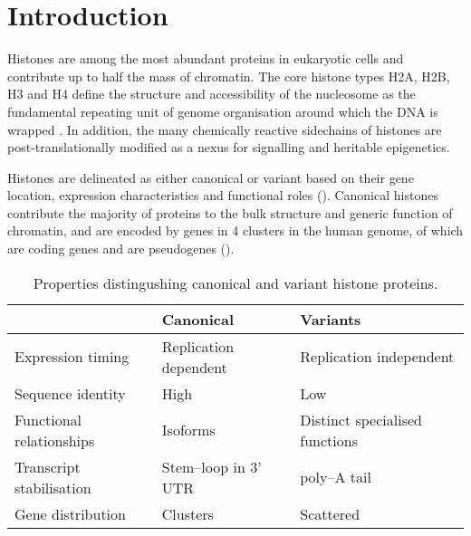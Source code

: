 \section{Introduction}

  Histones are among the most abundant proteins in eukaryotic cells
  and contribute up to half the mass of chromatin.
  The core histone types H2A, H2B, H3 and H4
  define the structure and accessibility of the nucleosome
  as the fundamental repeating unit of genome organisation
  around which the DNA is wrapped \citep{Luger1997structure}.
  In addition, the many chemically reactive sidechains of histones
  are post-translationally modified
  as a nexus for signalling and heritable epigenetics.

  Histones are delineated as either canonical or variant based on
  their gene location, expression characteristics and functional roles ().
  Canonical histones contribute the majority of proteins to
  the bulk structure and generic function of chromatin,
  and are encoded by \TotalGenes{} genes in 4 clusters in the human genome,
  of which \TotalCodingGenes{} are coding genes and \TotalPseudoGenes{} are pseudogenes ().

  \begin{table*}
    \caption{Properties distingushing canonical and variant histone proteins.}
    \label{tab:typical-histone-differences}
    \centering
    \begin{tabular}{l l l}
      \toprule
      \null                     & Canonical             & Variants \\
      \midrule
      Expression timing         & Replication dependent & Replication independent \\
      Sequence identity         & High                  & Low \\
      Functional relationships  & Isoforms              & Distinct specialised functions \\
      Transcript stabilisation  & Stem--loop in 3' UTR  & poly--A tail \\
      Gene distribution         & Clusters              & Scattered \\
      \bottomrule
    \end{tabular}
  \end{table*}


